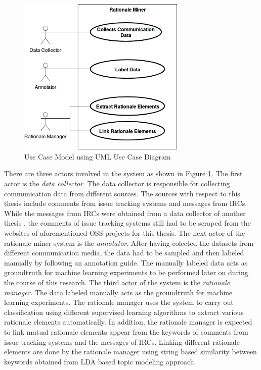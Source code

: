 \documentclass[a4paper,12pt,twoside]{report}
\begin{document}
\begin{figure}[h] %
    \centering
    \includegraphics[width=8cm]{thesis-use-case}
    \caption{Use Case Model using UML Use Case Diagram}
    \label{fig:usecaseModel}
\end{figure}
\noindent \newline
There are three actors involved in the system as shown in Figure \ref{fig:usecaseModel}. The first actor is the \textit{data collector}. The data collector is responsible for collecting communication data from different sources. The sources with respect to this thesis include comments from issue tracking systems and messages from \acs{IRC}s. While the messages from \acs{IRC}s were obtained from a data collector of another thesis \cite{Nonnenmacher2017}, the comments of issue tracking systems still had to be scraped from the websites of aforementioned \acs{OSS} projects for this thesis. 
\newline \newline
The next actor of the rationale miner system is the \textit{annotator}. After having colected the datasets from different communication media, the data had to be sampled and then labeled manually by following an annotation guide. The manually labeled data acts as groundtruth for machine learning experiments to be performed later on during the course of this research.
\newline \newline
The third actor of the system is the \textit{rationale manager}. The data labeled manually acts as the groundtruth for machine learning experiments. The rationale manager uses the system to carry out classification using different supervised learning algorithms to extract various rationale elements automatically. In addition, the rationale manager is expected to link mutual rationale elements appear from the keywords of comments from issue tracking systems and the messages of \acs{IRC}s. Linking different rationale elements are done by the rationale manager using string based similarity between keywords obtained from \acs{LDA} based topic modeling approach. 
\end{document}
